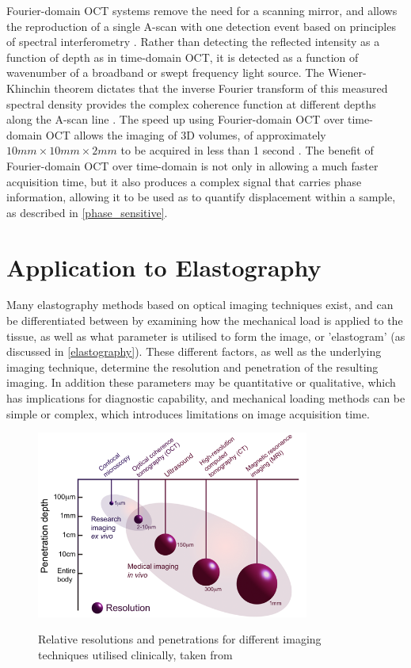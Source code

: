 Fourier-domain OCT systems remove the need for a scanning mirror, and allows the reproduction of a single A-scan with one detection event based on principles of spectral interferometry \cite{chin_parametric_2016}. Rather than detecting the reflected intensity as a function of depth as in time-domain OCT, it is detected as a function of wavenumber of a broadband or swept frequency light source. The Wiener-Khinchin theorem dictates that the inverse Fourier transform of this measured spectral density provides the complex coherence function at different depths along the A-scan line \cite{schmitt_optical_1999}. The speed up using Fourier-domain OCT over time-domain OCT allows the imaging of 3D volumes, of approximately $10mm \times 10mm \times 2mm$ to be acquired in less than 1 second \cite{kennedy_emergence_2017}. The benefit of Fourier-domain OCT over time-domain is not only in allowing a much faster acquisition time, but it also produces a complex signal that carries phase information, allowing it to be used as to quantify displacement within a sample, as described in \autoref{phase_sensitive}.

\section{Application to Elastography}\label{application_elastography}

Many elastography methods based on optical imaging techniques exist, and can be differentiated between by examining how the mechanical load is applied to the tissue, as well as what parameter is utilised to form the image, or 'elastogram' (as discussed in \autoref{elastography}). These different factors, as well as the underlying imaging technique, determine the resolution and penetration of the resulting imaging. In addition these parameters may be quantitative or qualitative, which has implications for diagnostic capability, and mechanical loading methods can be simple or complex, which introduces limitations on image acquisition time.

\begin{figure}[t]
	\centering
    \includegraphics[width=0.8\textwidth]{figures/technique_comparison.png}
    \label{image_techniques}
    \caption{Relative resolutions and penetrations for different imaging techniques utilised clinically, taken from \cite{optical+biomedical_engineering_laboratory_introduction_nodate}}
\end{figure}

